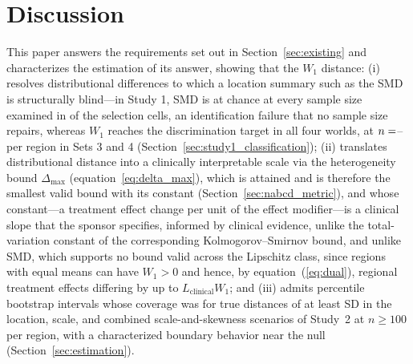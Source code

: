 \documentclass[AMA,Times1COL]{WileyNJDv5}
\begin{document}
\section{Discussion}\label{sec:discussion}

This paper answers the requirements set out in Section~\ref{sec:existing} and characterizes the estimation of its answer, showing that the $W_1$ distance: (i) resolves distributional differences to which a location summary such as the SMD is structurally blind---in Study 1, SMD is at chance at every sample size examined in  of the  selection cells, an identification failure that no sample size repairs, whereas $W_1$ reaches the discrimination target in all four worlds, at $n = \numval{reqnW1minSets34}$-- per region in Sets 3 and 4 (Section~\ref{sec:study1_classification}); (ii) translates distributional distance into a clinically interpretable scale via the heterogeneity bound \(\Delta_{\max}\) (equation~\ref{eq:delta_max}), which is attained and is therefore the smallest valid bound with its constant (Section~\ref{sec:nabcd_metric}), and whose constant---a treatment effect change per unit of the effect modifier---is a clinical slope that the sponsor specifies, informed by clinical evidence, unlike the total-variation constant of the corresponding Kolmogorov--Smirnov bound, and unlike SMD, which supports no bound valid across the Lipschitz class, since regions with equal means can have $W_1 > 0$ and hence, by equation~(\ref{eq:dual}), regional treatment effects differing by up to $L_{\text{clinical}} W_1$; and (iii) admits percentile bootstrap intervals whose coverage was  for true distances of at least  SD in the location, scale, and combined scale-and-skewness scenarios of Study~2 at \(n \geq 100\) per region, with a characterized boundary behavior near the null (Section~\ref{sec:estimation}).
\end{document}
